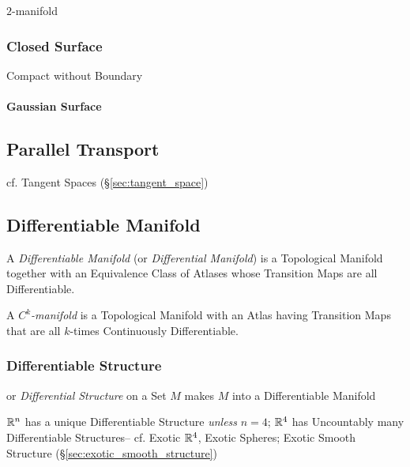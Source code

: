 $2$-manifold



\subsubsection{Closed Surface}\label{sec:closed_surface}

Compact without Boundary



\paragraph{Gaussian Surface}\label{sec:gaussian_surface}\hfill



\subsection{Parallel Transport}\label{sec:parallel_transport}

\fist cf. Tangent Spaces (\S\ref{sec:tangent_space})



\subsection{Differentiable Manifold}\label{sec:differentiable_manifold}

A \emph{Differentiable Manifold} (or \emph{Differential Manifold}) is a
Topological Manifold together with an Equivalence Class of Atlases whose
Transition Maps are all Differentiable.

A \emph{$C^k$-manifold} is a Topological Manifold with an Atlas having
Transition Maps that are all $k$-times Continuously Differentiable.



\subsubsection{Differentiable Structure}\label{sec:differentiable_structure}

or \emph{Differential Structure} on a Set $M$ makes $M$ into a Differentiable
Manifold

$\mathbb{R}^n$ has a unique Differentiable Structure \emph{unless} $n = 4$;
$\mathbb{R}^4$ has Uncountably many Differentiable Structures-- cf. Exotic
$\mathbb{R}^4$, Exotic Spheres; Exotic Smooth Structure
(\S\ref{sec:exotic_smooth_structure})



